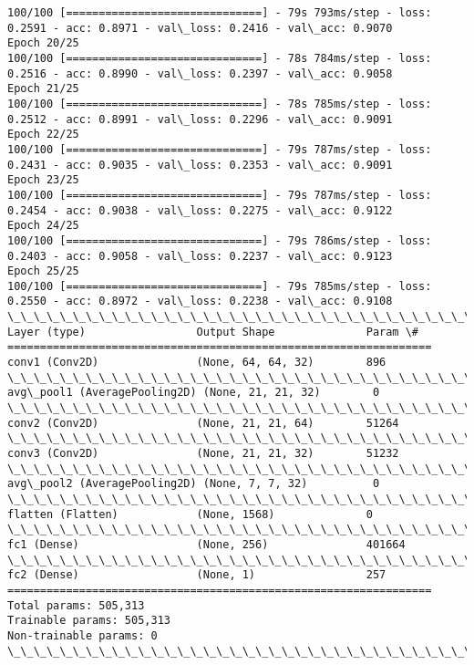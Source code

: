 \documentclass[11pt]{article}
\begin{document}
\begin{Verbatim}[commandchars=\\\{\}]
100/100 [==============================] - 79s 793ms/step - loss: 0.2591 - acc: 0.8971 - val\_loss: 0.2416 - val\_acc: 0.9070
Epoch 20/25
100/100 [==============================] - 78s 784ms/step - loss: 0.2516 - acc: 0.8990 - val\_loss: 0.2397 - val\_acc: 0.9058
Epoch 21/25
100/100 [==============================] - 78s 785ms/step - loss: 0.2512 - acc: 0.8991 - val\_loss: 0.2296 - val\_acc: 0.9091
Epoch 22/25
100/100 [==============================] - 79s 787ms/step - loss: 0.2431 - acc: 0.9035 - val\_loss: 0.2353 - val\_acc: 0.9091
Epoch 23/25
100/100 [==============================] - 79s 787ms/step - loss: 0.2454 - acc: 0.9038 - val\_loss: 0.2275 - val\_acc: 0.9122
Epoch 24/25
100/100 [==============================] - 79s 786ms/step - loss: 0.2403 - acc: 0.9058 - val\_loss: 0.2237 - val\_acc: 0.9123
Epoch 25/25
100/100 [==============================] - 79s 785ms/step - loss: 0.2550 - acc: 0.8972 - val\_loss: 0.2238 - val\_acc: 0.9108
\_\_\_\_\_\_\_\_\_\_\_\_\_\_\_\_\_\_\_\_\_\_\_\_\_\_\_\_\_\_\_\_\_\_\_\_\_\_\_\_\_\_\_\_\_\_\_\_\_\_\_\_\_\_\_\_\_\_\_\_\_\_\_\_\_
Layer (type)                 Output Shape              Param \#   
=================================================================
conv1 (Conv2D)               (None, 64, 64, 32)        896       
\_\_\_\_\_\_\_\_\_\_\_\_\_\_\_\_\_\_\_\_\_\_\_\_\_\_\_\_\_\_\_\_\_\_\_\_\_\_\_\_\_\_\_\_\_\_\_\_\_\_\_\_\_\_\_\_\_\_\_\_\_\_\_\_\_
avg\_pool1 (AveragePooling2D) (None, 21, 21, 32)        0         
\_\_\_\_\_\_\_\_\_\_\_\_\_\_\_\_\_\_\_\_\_\_\_\_\_\_\_\_\_\_\_\_\_\_\_\_\_\_\_\_\_\_\_\_\_\_\_\_\_\_\_\_\_\_\_\_\_\_\_\_\_\_\_\_\_
conv2 (Conv2D)               (None, 21, 21, 64)        51264     
\_\_\_\_\_\_\_\_\_\_\_\_\_\_\_\_\_\_\_\_\_\_\_\_\_\_\_\_\_\_\_\_\_\_\_\_\_\_\_\_\_\_\_\_\_\_\_\_\_\_\_\_\_\_\_\_\_\_\_\_\_\_\_\_\_
conv3 (Conv2D)               (None, 21, 21, 32)        51232     
\_\_\_\_\_\_\_\_\_\_\_\_\_\_\_\_\_\_\_\_\_\_\_\_\_\_\_\_\_\_\_\_\_\_\_\_\_\_\_\_\_\_\_\_\_\_\_\_\_\_\_\_\_\_\_\_\_\_\_\_\_\_\_\_\_
avg\_pool2 (AveragePooling2D) (None, 7, 7, 32)          0         
\_\_\_\_\_\_\_\_\_\_\_\_\_\_\_\_\_\_\_\_\_\_\_\_\_\_\_\_\_\_\_\_\_\_\_\_\_\_\_\_\_\_\_\_\_\_\_\_\_\_\_\_\_\_\_\_\_\_\_\_\_\_\_\_\_
flatten (Flatten)            (None, 1568)              0         
\_\_\_\_\_\_\_\_\_\_\_\_\_\_\_\_\_\_\_\_\_\_\_\_\_\_\_\_\_\_\_\_\_\_\_\_\_\_\_\_\_\_\_\_\_\_\_\_\_\_\_\_\_\_\_\_\_\_\_\_\_\_\_\_\_
fc1 (Dense)                  (None, 256)               401664    
\_\_\_\_\_\_\_\_\_\_\_\_\_\_\_\_\_\_\_\_\_\_\_\_\_\_\_\_\_\_\_\_\_\_\_\_\_\_\_\_\_\_\_\_\_\_\_\_\_\_\_\_\_\_\_\_\_\_\_\_\_\_\_\_\_
fc2 (Dense)                  (None, 1)                 257       
=================================================================
Total params: 505,313
Trainable params: 505,313
Non-trainable params: 0
\_\_\_\_\_\_\_\_\_\_\_\_\_\_\_\_\_\_\_\_\_\_\_\_\_\_\_\_\_\_\_\_\_\_\_\_\_\_\_\_\_\_\_\_\_\_\_\_\_\_\_\_\_\_\_\_\_\_\_\_\_\_\_\_\_

    \end{Verbatim}
\end{document}
